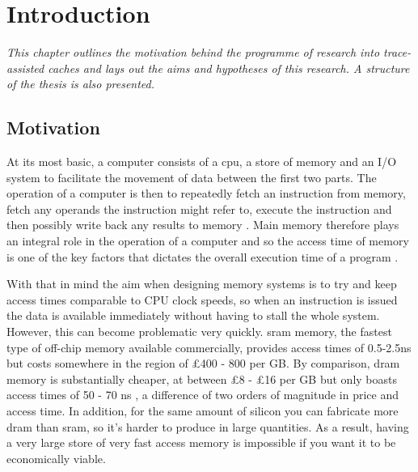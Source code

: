 \chapter{Introduction}

\emph{This chapter outlines the motivation behind the programme of research into trace-assisted caches and lays out the aims and hypotheses of this research. A structure of the thesis is also presented.}

\section{Motivation}


At its most basic, a computer consists of a \gls{cpu}, a store of memory and an I/O system to facilitate the movement of data between the first two parts. The operation of a computer is then to repeatedly fetch an instruction from memory, fetch any operands the instruction might refer to, execute the instruction and then possibly write back any results to memory \cite{przybylskiCacheMemoryHierarchy1990}. Main memory therefore plays an integral role in the operation of a computer and so the access time of memory is one of the key factors that dictates the overall execution time of a program \cite{pattersonComputerOrganizationDesign2018} \cite{pattersonCaseIntelligentRAM1997}. 

With that in mind the aim when designing memory systems is to try and keep access times comparable to CPU clock speeds, so when an instruction is issued the data is available immediately without having to stall the whole system. However, this can become problematic very quickly. \gls{sram} memory, the fastest type of off-chip memory available commercially, provides access times of 0.5-2.5ns but costs somewhere in the region of £400 - 800 per GB. By comparison, \gls{dram} memory is substantially cheaper, at between £8 - £16 per GB but only boasts access times of 50 - 70 ns \cite{pattersonComputerOrganizationDesign2018}, a difference of two orders of magnitude in price and access time. In addition, for the same amount of silicon you can fabricate more \gls{dram} than \gls{sram}, so it's harder to produce in large quantities. As a result, having a very large store of very fast access memory is impossible if you want it to be economically viable.

